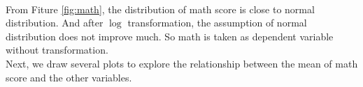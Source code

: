 \documentclass[11pt,a4paper]{article}
\begin{document}
\begin{minipage}{\linewidth}
    \label{fig:math}
\end{minipage}\\

From Fiture \ref{fig:math}, the distribution of math score is close to normal distribution. And after $\log$ transformation, 
the assumption of normal distribution does not improve much. So math is taken as dependent variable without transformation.\\

Next, we draw several plots to explore the relationship between the mean of math score and the other variables.\\

\begin{minipage}{\linewidth}
    \label{fig:variable}
\end{minipage}\\
\end{document}
